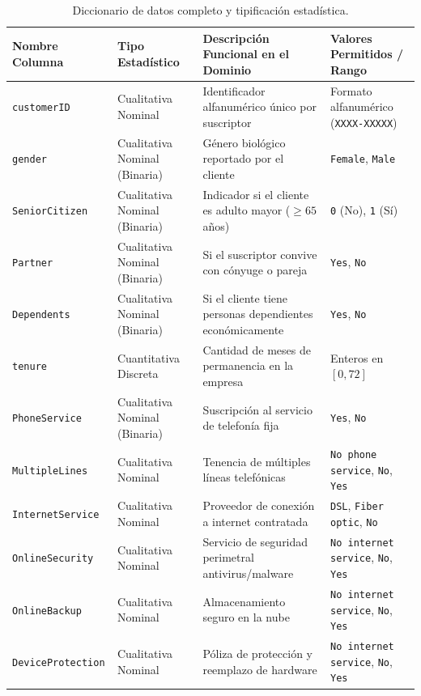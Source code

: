 \documentclass[11pt,letterpaper]{article}
\begin{document}
\begin{table}[H]
    \centering
    \scriptsize
    \caption{Diccionario de datos completo y tipificación estadística.}
    \label{tab:diccionario_datos}
    \begin{tabularx}{\linewidth}{p{2.8cm}p{3.2cm}Xp{2.6cm}}
        \toprule
        \textbf{Nombre Columna} & \textbf{Tipo Estadístico} & \textbf{Descripción Funcional en el Dominio} & \textbf{Valores Permitidos / Rango} \\
        \midrule
        \texttt{customerID} & Cualitativa Nominal & Identificador alfanumérico único por suscriptor & Formato alfanumérico (\texttt{XXXX-XXXXX}) \\
        \texttt{gender} & Cualitativa Nominal (Binaria) & Género biológico reportado por el cliente & \texttt{Female}, \texttt{Male} \\
        \texttt{SeniorCitizen} & Cualitativa Nominal (Binaria) & Indicador si el cliente es adulto mayor ($\ge 65$ años) & \texttt{0} (No), \texttt{1} (Sí) \\
        \texttt{Partner} & Cualitativa Nominal (Binaria) & Si el suscriptor convive con cónyuge o pareja & \texttt{Yes}, \texttt{No} \\
        \texttt{Dependents} & Cualitativa Nominal (Binaria) & Si el cliente tiene personas dependientes económicamente & \texttt{Yes}, \texttt{No} \\
        \texttt{tenure} & Cuantitativa Discreta & Cantidad de meses de permanencia en la empresa & Enteros en $[0, 72]$ \\
        \texttt{PhoneService} & Cualitativa Nominal (Binaria) & Suscripción al servicio de telefonía fija & \texttt{Yes}, \texttt{No} \\
        \texttt{MultipleLines} & Cualitativa Nominal & Tenencia de múltiples líneas telefónicas & \texttt{No phone service}, \texttt{No}, \texttt{Yes} \\
        \texttt{InternetService} & Cualitativa Nominal & Proveedor de conexión a internet contratada & \texttt{DSL}, \texttt{Fiber optic}, \texttt{No} \\
        \texttt{OnlineSecurity} & Cualitativa Nominal & Servicio de seguridad perimetral antivirus/malware & \texttt{No internet service}, \texttt{No}, \texttt{Yes} \\
        \texttt{OnlineBackup} & Cualitativa Nominal & Almacenamiento seguro en la nube & \texttt{No internet service}, \texttt{No}, \texttt{Yes} \\
        \texttt{DeviceProtection}& Cualitativa Nominal & Póliza de protección y reemplazo de hardware & \texttt{No internet service}, \texttt{No}, \texttt{Yes} \\

\end{tabularx}
\end{table}
\end{document}
